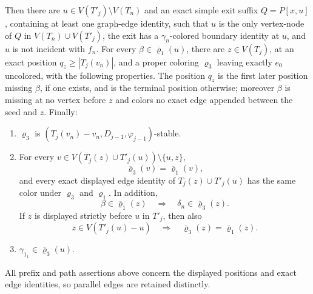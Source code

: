 \begin{lemma}
Then there are \(u\in V(T'_j)\setminus V(T_n)\) and an exact simple exit
suffix \(Q=P[x,u]\), containing at least one graph-edge identity, such that
\(u\) is the only vertex-node of \(Q\) in \(V(T_n)\cup V(T'_j)\), the
exit has a \(\gamma_n\)-colored boundary identity at \(u\), and \(u\) is
not incident with \(f_n\).  For every
\(\beta\in\overline{\varrho}_1(u)\), there are \(z\in V(T_j)\), at an
exact position \(q_z\ge |T_j(v_n)|\), and a proper coloring
\(\varrho_3\) leaving exactly \(e_0\) uncolored, with the following
properties.  The position \(q_z\) is the first later position missing
\(\beta\), if one exists, and is the terminal position otherwise; moreover
\(\beta\) is missing at no vertex before \(z\) and colors no exact edge
appended between the seed and \(z\).  Finally:
\begin{enumerate}
\item[(d1)] \(\varrho_3\) is
      \((T_j(v_n)-v_n,D_{j-1},\varphi_{j-1})\)-stable.
\item[(d2)] For every
      \(v\in V(T_j(z)\cup T'_j(u))\setminus\{u,z\}\),
      \[
                  \overline{\varrho}_3(v)
                    =\overline{\varrho}_1(v),
      \]
      and every exact displayed edge identity of
      \(T_j(z)\cup T'_j(u)\) has the same color under
      \(\varrho_3\) and \(\varrho_1\).  In addition,
      \[
       \beta\in\overline{\varrho}_1(z)
       \quad\Longrightarrow\quad
       \delta_n\in\overline{\varrho}_3(z).
      \]
      If \(z\) is displayed strictly before \(u\) in \(T'_j\), then also
      \[
       z\in V(T'_j(u)-u)
       \quad\Longrightarrow\quad
       \overline{\varrho}_3(z)=\overline{\varrho}_1(z).       \tag{d2z}
      \]
\item[(d3)] \(\gamma_{1_1}\in\overline{\varrho}_3(u)\).
\end{enumerate}
All prefix and path assertions above concern the displayed positions and
exact edge identities, so parallel edges are retained distinctly.
\end{lemma}
